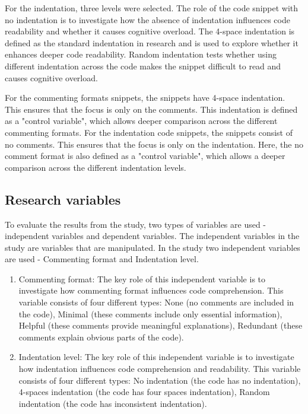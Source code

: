 For the indentation, three levels were selected. 
The role of the code snippet with no indentation is to investigate how the absence of indentation influences code readability and whether it causes cognitive overload.
The 4-space indentation is defined as the standard indentation in research and is used to explore whether it enhances deeper code readability.  
Random indentation tests whether using different indentation across the code makes the snippet difficult to read and causes cognitive overload.



For the commenting formats snippets, the snippets have 4-space indentation. This ensures that the focus is only on the comments. This indentation is defined as a "control variable", which allows deeper comparison across the different commenting formats. 
For the indentation code snippets, the snippets consist of no comments. This ensures that the focus is only on the indentation. Here, the no comment format is also defined as a "control variable", which allows a deeper comparison across the different indentation levels. 

\subsection{Research variables}
To evaluate the results from the study, two types of variables are used - independent variables and dependent variables. The independent variables in the study are variables that are manipulated. In the study   two independent variables are used - Commenting format and Indentation level.

\begin{enumerate}
     \item Commenting format: The key role of this independent variable is to investigate how commenting format influences code comprehension. This variable consists of four different types: None (no comments are included in the code), Minimal (these comments include only essential information), Helpful (these comments provide meaningful explanations), Redundant (these comments explain obvious parts of the code). 

    \item Indentation level: The key role of this independent variable is to investigate how indentation influences code comprehension and readability. This variable consists of four different types: No indentation (the code has no indentation), 4-spaces indentation (the code has four spaces indentation), Random indentation (the code has inconsistent indentation). 
\end{enumerate}


